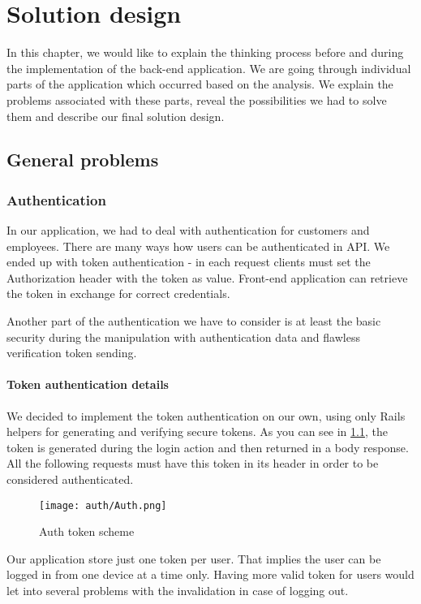 \chapter{Solution design}
In this chapter, we would like to explain the thinking process before and during the implementation of the back-end application. We are going through individual parts of the application which occurred based on the analysis. We explain the problems associated with these parts, reveal the possibilities we had to solve them and describe our final solution design. 

\section{General problems}
\subsection{Authentication}
In our application, we had to deal with authentication for customers and employees. There are many ways how users can be authenticated in API. We ended up with token authentication - in each request clients must set the Authorization header with the token as value. Front-end application can retrieve the token in exchange for correct credentials.

Another part of the authentication we have to consider is at least the basic security during the manipulation with authentication data and flawless verification token sending.

\subsubsection{Token authentication details}

We decided to implement the token authentication on our own, using only Rails helpers for generating and verifying secure tokens. As you can see in \ref{auth-token-scheme}, the token is generated during the login action and then returned in a body response. All the following requests must have this token in its header in order to be considered authenticated.

\begin{figure}[h]\centering
\texttt{[image: auth/Auth.png]} 
\caption{Auth token scheme}\label{auth-token-scheme}
\end{figure}

Our application store just one token per user. That implies the user can be logged in from one device at a time only. Having more valid token for users would let into several problems with the invalidation in case of logging out.

